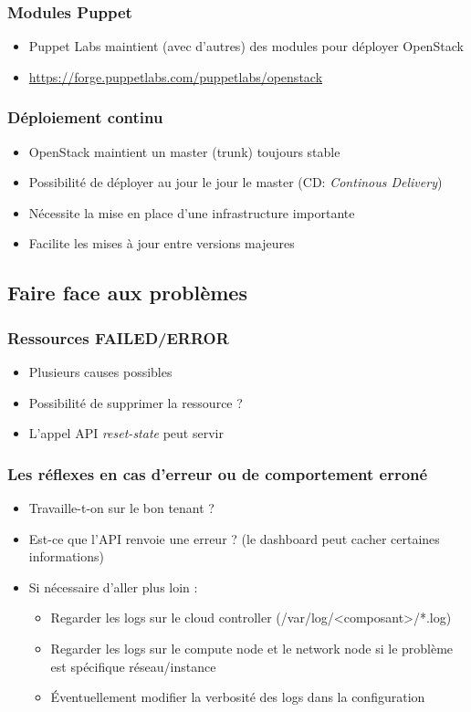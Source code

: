   \begin{frame}
    \frametitle{Modules Puppet}
    \begin{itemize}
      \item Puppet Labs maintient (avec d'autres) des modules pour déployer OpenStack
      \item \url{https://forge.puppetlabs.com/puppetlabs/openstack}
    \end{itemize}
  \end{frame}

  \begin{frame}
    \frametitle{Déploiement continu}
    \begin{itemize}
      \item OpenStack maintient un master (trunk) toujours stable
      \item Possibilité de déployer au jour le jour le master (CD: \textit{Continous Delivery})
      \item Nécessite la mise en place d'une infrastructure importante
      \item Facilite les mises à jour entre versions majeures
    \end{itemize}
  \end{frame}

  \subsection[Problèmes]{Faire face aux problèmes}

  \begin{frame}
    \frametitle{Ressources FAILED/ERROR}
    \begin{itemize}
      \item Plusieurs causes possibles
      \item Possibilité de supprimer la ressource ?
      \item L'appel API \textit{reset-state} peut servir
    \end{itemize}
  \end{frame}

  \begin{frame}
    \frametitle{Les réflexes en cas d'erreur ou de comportement erroné}
    \begin{itemize}
      \item Travaille-t-on sur le bon tenant ?
      \item Est-ce que l'API renvoie une erreur ? (le dashboard peut cacher certaines informations)
      \item Si nécessaire d'aller plus loin :
        \begin{itemize}
          \item Regarder les logs sur le cloud controller (/var/log/\textless composant\textgreater/*.log)
          \item Regarder les logs sur le compute node et le network node si le problème est spécifique réseau/instance
          \item Éventuellement modifier la verbosité des logs dans la configuration
        \end{itemize}
    \end{itemize}
  \end{frame}

